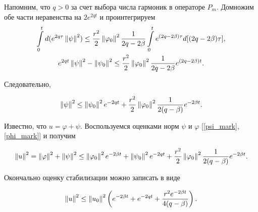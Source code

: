 Напомним, что $q > 0$ за счет выбора числа гармоник в операторе $P_m$.
Домножим обе части неравенства на $2e^{2qt}$ и проинтегрируем
\begin{gather*}
    \int\limits_0^t{d(e^{2q\tau}} \left\lVert\psi\right\rVert^2) \le 
    \frac{r^2}{2} \left\lVert\varphi_0\right\rVert^2 \frac{1}{2q - 2\beta} 
    \int\limits_0^t {e^{(2q -2\beta) \tau} d[(2q -2\beta) \tau]},\\*
    e^{2qt} \left\lVert\psi\right\rVert^2 - \left\lVert\psi_0\right\rVert^2 \le \frac{r^2}{2}
    \left\lVert\varphi_0\right\rVert^2 \frac{1}{2q - 2\beta} e^{(2q -2\beta)t}.
\end{gather*}

Следовательно, 

\begin{equation}\label{psi_mark}
    \left\lVert\psi\right\rVert^2 \le \left\lVert\psi_0\right\rVert^2 e^{-2qt} + \frac{r^2}{2} 
    \left\lVert\varphi_0\right\rVert^2 \frac{1}{2(q - \beta)} e^{-2\beta t}.
\end{equation}

Известно, что $u = \varphi + \psi$. Воспользуемся оценками норм $\psi$ и 
$\varphi$ [\eqref{psi_mark}, \eqref{phi_mark}] и получим

\begin{gather*}
    \left\lVert u\right\rVert^2 = \left\lVert\varphi\right\rVert^2 + \left\lVert\psi\right\rVert^2 \le \left\lVert\varphi_0\right\rVert^2 
    e^{-2\beta t} + \left\lVert\psi_0\right\rVert^2 e^{-2qt} + \frac{r^2}{2} \left\lVert\varphi_0\right\rVert^2 
    \frac{1}{2(q - \beta)} e^{-2\beta t}.
\end{gather*}

Окончально оценку стабилизации можно записать в виде

\begin{equation}
    \left\lVert u\right\rVert^2 \le \left\lVert u_0\right\rVert^2 \left( e^{-2\beta t} + e^{-2qt} + 
    \frac{r^2 e^{-2\beta t}}{4(q - \beta)} \right).
\end{equation}
